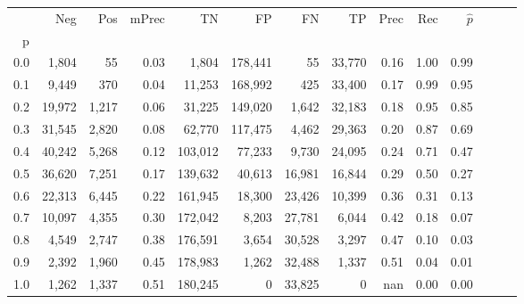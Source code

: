 \begin{tabular}{rrrrrrrrrrrrrr}
\toprule
{} &     Neg &    Pos & mPrec &       TN &       FP &      FN &      TP &  Prec &   Rec & $\hat{p}$ \\
p   &         &        &       &          &          &         &         &       &       &           \\
\midrule
0.0 &   1,804 &     55 &  0.03 &    1,804 &  178,441 &      55 &  33,770 &  0.16 &  1.00 &      0.99 \\
0.1 &   9,449 &    370 &  0.04 &   11,253 &  168,992 &     425 &  33,400 &  0.17 &  0.99 &      0.95 \\
0.2 &  19,972 &  1,217 &  0.06 &   31,225 &  149,020 &   1,642 &  32,183 &  0.18 &  0.95 &      0.85 \\
0.3 &  31,545 &  2,820 &  0.08 &   62,770 &  117,475 &   4,462 &  29,363 &  0.20 &  0.87 &      0.69 \\
0.4 &  40,242 &  5,268 &  0.12 &  103,012 &   77,233 &   9,730 &  24,095 &  0.24 &  0.71 &      0.47 \\
0.5 &  36,620 &  7,251 &  0.17 &  139,632 &   40,613 &  16,981 &  16,844 &  0.29 &  0.50 &      0.27 \\
0.6 &  22,313 &  6,445 &  0.22 &  161,945 &   18,300 &  23,426 &  10,399 &  0.36 &  0.31 &      0.13 \\
0.7 &  10,097 &  4,355 &  0.30 &  172,042 &    8,203 &  27,781 &   6,044 &  0.42 &  0.18 &      0.07 \\
0.8 &   4,549 &  2,747 &  0.38 &  176,591 &    3,654 &  30,528 &   3,297 &  0.47 &  0.10 &      0.03 \\
0.9 &   2,392 &  1,960 &  0.45 &  178,983 &    1,262 &  32,488 &   1,337 &  0.51 &  0.04 &      0.01 \\
1.0 &   1,262 &  1,337 &  0.51 &  180,245 &        0 &  33,825 &       0 &   nan &  0.00 &      0.00 \\
\bottomrule
\end{tabular}
